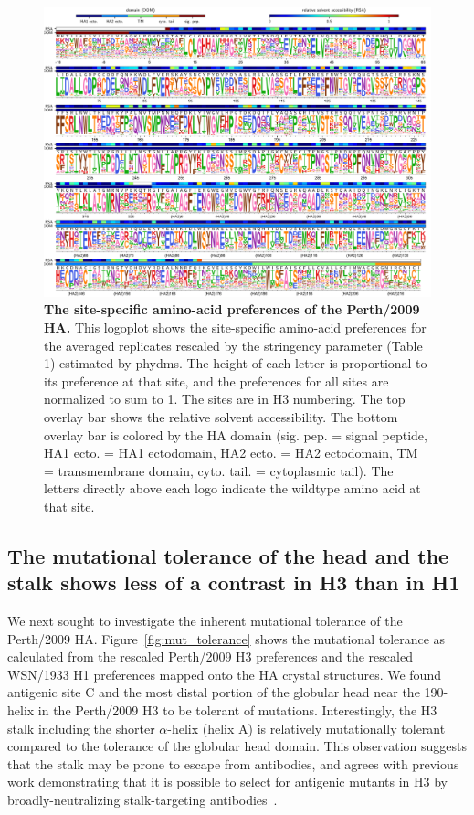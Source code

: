 \documentclass[11pt]{article}
\begin{document}
\begin{figure}
\centerline{\includegraphics[width=\textwidth]{figs/prefslogoplot/rescaled-avgprefs_prefs.pdf}}
\caption{\label{fig:logoplot}
{\bf The site-specific amino-acid preferences of the Perth/2009 HA.}
This logoplot shows the site-specific amino-acid preferences for the averaged replicates rescaled by the stringency parameter (Table 1) estimated by phydms.
The height of each letter is proportional to its preference at that site, and the preferences for all sites are normalized to sum to 1.
The sites are in H3 numbering.
The top overlay bar shows the relative solvent accessibility.
The bottom overlay bar is colored by the HA domain (sig. pep. = signal peptide, HA1 ecto. = HA1 ectodomain, HA2 ecto. = HA2 ectodomain, TM = transmembrane domain, cyto. tail. = cytoplasmic tail).
The letters directly above each logo indicate the wildtype amino acid at that site.
}
\end{figure}

\subsection*{The mutational tolerance of the head and the stalk shows less of a contrast in H3 than in H1}
We next sought to investigate the inherent mutational tolerance of the Perth/2009 HA. 
Figure~\ref{fig:mut_tolerance} shows the mutational tolerance as calculated from the rescaled Perth/2009 H3 preferences and the rescaled WSN/1933 H1 preferences mapped onto the HA crystal structures.
We found antigenic site C and the most distal portion of the globular head near the 190-helix in the Perth/2009 H3 to be tolerant of mutations.
Interestingly, the H3 stalk including the shorter $\alpha$-helix (helix A) is relatively mutationally tolerant compared to the tolerance of the globular head domain. 
This observation suggests that the stalk may be prone to escape from antibodies, and agrees with previous work demonstrating that it is possible to select for antigenic mutants in H3 by broadly-neutralizing stalk-targeting antibodies~\citep{ekiert2011highly, friesen2014common, chai2016two, yamayoshi2017human}.
\end{document}
